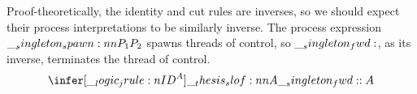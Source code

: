 
Proof-theoretically, the identity and cut rules are inverses, so we should expect their process interpretations to be similarly inverse.
The process expression $\__singleton_spawn:nn {P_1} {P_2}$ spawns threads of control, so $\__singleton_fwd:$, as its inverse, terminates the thread of control.
\begin{equation*}
  \infer[\jrule{ID}^A]{\slof{A |- \fwd : A}}{}
\end{equation*}










\begin{marginfigure}
\end{marginfigure}

